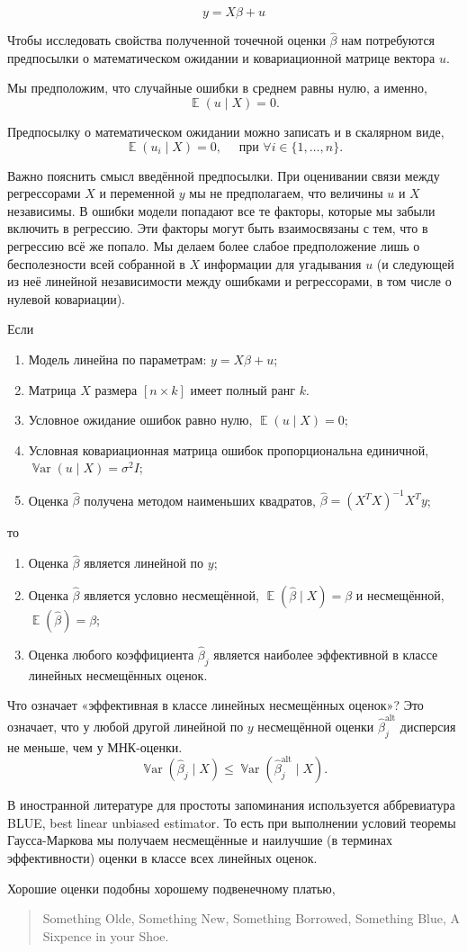 \documentclass[12pt]{article}
\DeclareMathOperator{\Var}{\mathbb{V}ar}
\DeclareMathOperator{\E}{\mathbb{E}}
\newcommand{\hb}{\hat{\beta}}
\newcommand{\alt}{\text{alt}}
\newcommand{\gaussmarkov}{
\begin{enumerate}[label=\arabic*.]
    \item Модель линейна по параметрам: $y = X\beta + u$;
    \item Матрица $X$ размера $[n \times k]$ имеет полный ранг $k$.
    \item Условное ожидание ошибок равно нулю, $\E(u\mid X) = 0$;
    \item Условная ковариационная матрица ошибок пропорциональна единичной, $\Var(u\mid X) = \sigma^2 I$;
    \item Оценка $\hb$ получена методом наименьших квадратов, $\hb = (X^T X)^{-1}X^T y$;
\end{enumerate}}
\begin{document}
\[y = X\beta + u\]

Чтобы исследовать свойства полученной точечной оценки $\hb$ нам потребуются предпосылки о математическом ожидании и ковариационной матрице вектора $u$.

Мы предположим, что случайные ошибки в среднем равны нулю, а именно,
\[
\E(u \mid X) = 0.
\]


Предпосылку о математическом ожидании можно записать и в скалярном виде,
\[
\E(u_i \mid X) = 0, \quad \text{ при } \forall i \in \{1, \dots, n\}.
\]

Важно пояснить смысл введённой предпосылки. При оценивании связи между регрессорами $X$ и переменной $y$ мы не предполагаем, что величины $u$ и $X$ независимы. В ошибки модели попадают все те факторы, которые мы забыли включить в регрессию. Эти факторы могут быть взаимосвязаны с тем, что в регрессию всё же попало. Мы делаем более слабое предположение лишь о бесполезности всей собранной в $X$ информации для угадывания $u$ (и следующей из неё линейной независимости между ошибками и регрессорами, в том числе о нулевой ковариации).

\begin{theorem}
Если 
\gaussmarkov
то
\begin{enumerate}[label=(\alph*)]
    \item Оценка $\hb$ является линейной по $y$;
    \item Оценка $\hb$ является условно несмещённой, $\E(\hb \mid X) = \beta$ и несмещённой, $\E(\hb) = \beta$;
    \item Оценка любого коэффициента $\hb_j$ является наиболее эффективной в классе линейных несмещённых оценок. 
\end{enumerate}
\end{theorem}

Что означает «эффективная в классе линейных несмещённых оценок»?
Это означает, что у любой другой линейной по $y$ несмещённой оценки $\hb^{\alt}_j$ дисперсия не меньше, чем у МНК-оценки.
\[
\Var(\hb_j \mid X) \leq \Var(\hb^{\alt}_j \mid X).
\]



В иностранной литературе для простоты запоминания используется аббревиатура BLUE, best linear unbiased estimator. 
То есть при выполнении условий теоремы Гаусса-Маркова мы получаем несмещённые и наилучшие (в терминах эффективности) оценки в классе всех линейных оценок.

Хорошие оценки подобны хорошему подвенечному платью,
\begin{quotation}
Something Olde, Something New, Something Borrowed, Something Blue, A Sixpence in your Shoe.    
\end{quotation}
\end{document}
